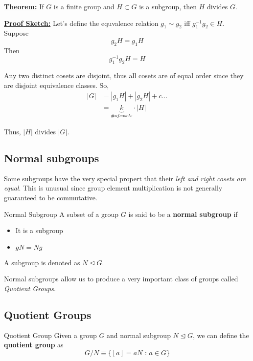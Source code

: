 \documentclass[11pt]{article}
\begin{document}
\vskip 0.5cm
\begin{dottedbox}
  \underline{\textbf{Theorem:}} If $G$ is a finite group and $H \subset G$ is a subgroup, then $H$ divides $G$.

  \vskip 0.5cm
  \underline{\textbf{Proof Sketch:}} Let's define the equvalence relation $g_1 \sim g_2$ iff $g_1^{-1} g_2 \in H$. Suppose 
  \[ g_2 H = g_1 H \]
  Then 
  \[ g_1^{-1}g_2 H = H \]
  
  Any two distinct cosets are disjoint, thus all cosets are of equal order since they are disjoint equivalence classes. So, 
  \begin{align}
    \lvert G \rvert &= |g_1 H| + |g_2 H| + c\dots \\
    &= \underbrace{k}_{\# of cosets} \cdot \lvert H \rvert
  \end{align}

  Thus, $\lvert H \rvert$ divides $\lvert G \rvert$.
\end{dottedbox}

\vskip 1cm
\subsection{Normal subgroups}

\vskip 0.5cm
Some subgroups have the very special propert that their \emph{left and right cosets are equal}. This is unusual since group element multiplication is not generally guaranteed to be commutative.

\begin{mathdefinitionbox}{Normal Subgroup}
\vskip 0.5cm
  A subset of a group $G$ is said to be a \textbf{normal subgroup} if 
  \begin{itemize}
    \item It is a subgroup
    \item $gN = Ng$ 
  \end{itemize}
  A subgroup is denoted as $N \trianglelefteq G$.
\end{mathdefinitionbox}

\vskip 0.5cm
Normal subgroups allow us to produce a very important class of groups called \emph{Quotient Groups}.

\vskip 1cm
\subsection{Quotient Groups}

\vskip 0.5cm

\begin{mathdefinitionbox}{Quotient Group}
\vskip 0.5cm
  Given a group $G$ and normal subgroup $N \trianglelefteq G$, we can define the \textbf{quotient group} as 
  \[ G/N \equiv \{ [a] = aN \text{ : } a \in G \} \]
\end{mathdefinitionbox}
\end{document}
